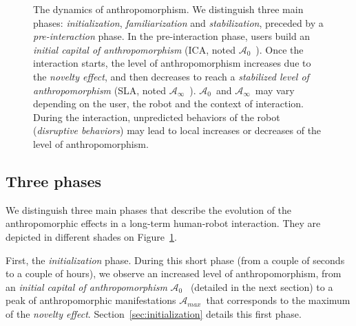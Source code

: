 \documentclass{frontiersSCNS} %
\newcommand{\ICA}{{$\mathcal{A}_0$~}}
\newcommand{\SLA}{{$\mathcal{A}_\infty$~}}
\newcommand{\AntMax}{{$\mathcal{A}_{max}$~}}
\begin{document}
\begin{figure}[htb]

\caption{The dynamics of anthropomorphism. We distinguish three main phases:
    \emph{initialization}, \emph{familiarization} and \emph{stabilization},
    preceded by a \emph{pre-interaction} phase. In the pre-interaction phase,
    users build an \emph{initial capital of anthropomorphism} (ICA, noted \ICA).
    Once the interaction starts, the level of anthropomorphism increases due to
    the \emph{novelty effect}, and then decreases to reach a \emph{stabilized
    level of anthropomorphism} (SLA, noted \SLA). \ICA and \SLA may vary
    depending on the user, the robot and the context of interaction.  During the
    interaction, unpredicted behaviors of the robot (\emph{disruptive
    behaviors}) may lead to local increases or decreases of the level of
    anthropomorphism.}

\label{fig:dynamics}
\end{figure}

\subsection{Three phases}
\label{sec:phases}

We distinguish three main phases that describe the evolution of the
anthropomorphic effects in a long-term human-robot interaction. They are
depicted in different shades on Figure~\ref{fig:dynamics}.

First, the \emph{initialization} phase. During this short phase (from a couple
of seconds to a couple of hours), we observe an increased level of
anthropomorphism, from an \emph{initial capital of anthropomorphism} \ICA
(detailed in the next section) to a peak of anthropomorphic manifestations
\AntMax that corresponds to the maximum of the \emph{novelty effect}.
Section~\ref{sec:initialization} details this first phase.
\end{document}
